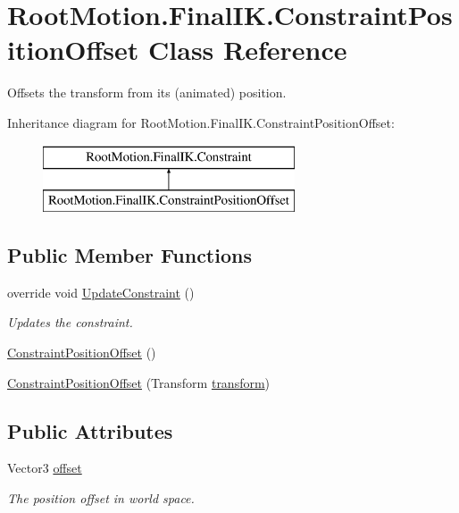 \hypertarget{class_root_motion_1_1_final_i_k_1_1_constraint_position_offset}{}\section{Root\+Motion.\+Final\+I\+K.\+Constraint\+Position\+Offset Class Reference}
\label{class_root_motion_1_1_final_i_k_1_1_constraint_position_offset}


Offsets the transform from it\textquotesingle{}s (animated) position.  


Inheritance diagram for Root\+Motion.\+Final\+I\+K.\+Constraint\+Position\+Offset\+:\begin{figure}[H]
\begin{center}
\leavevmode
\includegraphics[height=2.000000cm]{class_root_motion_1_1_final_i_k_1_1_constraint_position_offset}
\end{center}
\end{figure}
\subsection*{Public Member Functions}
\begin{DoxyCompactItemize}
\item 
override void \mbox{\hyperlink{class_root_motion_1_1_final_i_k_1_1_constraint_position_offset_a0b9bf29de200b4f52e88dd817e989ceb}{Update\+Constraint}} ()
\begin{DoxyCompactList}\small\item\em Updates the constraint. \end{DoxyCompactList}\item 
\mbox{\hyperlink{class_root_motion_1_1_final_i_k_1_1_constraint_position_offset_a3fa3b28036aaacb92ce35f4faf6136ed}{Constraint\+Position\+Offset}} ()
\item 
\mbox{\hyperlink{class_root_motion_1_1_final_i_k_1_1_constraint_position_offset_a071d2be65d6577b946941c668ce4d7f4}{Constraint\+Position\+Offset}} (Transform \mbox{\hyperlink{class_root_motion_1_1_final_i_k_1_1_constraint_a2fe5a6e41ac6da0e5cb97a231696f937}{transform}})
\end{DoxyCompactItemize}
\subsection*{Public Attributes}
\begin{DoxyCompactItemize}
\item 
Vector3 \mbox{\hyperlink{class_root_motion_1_1_final_i_k_1_1_constraint_position_offset_a4ab0d6039063eb10ef96065ff2308fe5}{offset}}
\begin{DoxyCompactList}\small\item\em The position offset in world space. \end{DoxyCompactList}\end{DoxyCompactItemize}
